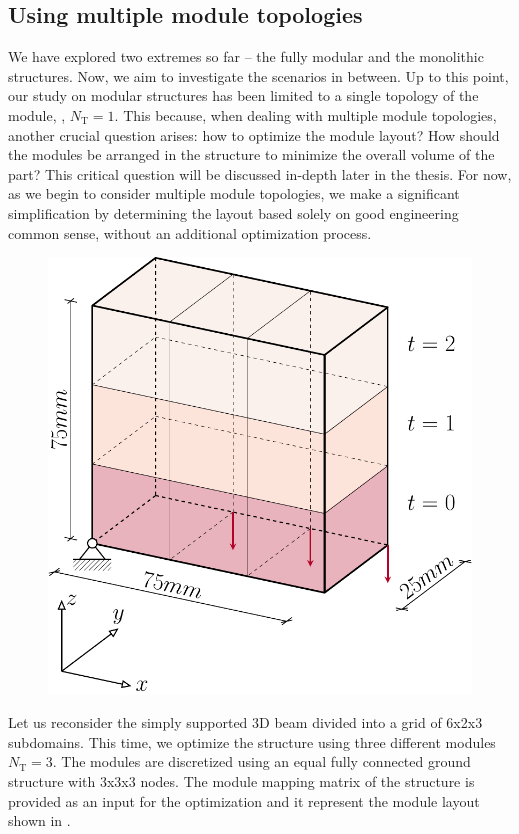 \subsection{Using multiple module topologies}
We have explored two extremes so far -- the fully modular and the monolithic structures. Now, we aim to investigate the scenarios in between. Up to this point, our study on modular structures has been limited to a single topology of the module, \ie, $N_\text{T}=1$. This because, when dealing with multiple module topologies, another crucial question arises: how to optimize the module layout? How should the modules be arranged in the structure to minimize the overall volume of the part? This critical question will be discussed in-depth later in the thesis. For now, as we begin to consider multiple module topologies, we make a significant simplification by determining the layout based solely on good engineering common sense, without an additional optimization process.

\begin{figure}
    \centering
    \includegraphics[width=0.6\linewidth]{figures/05_cellular_opt/00_mutiple_bc/supported_3D_symm.pdf}
    \caption{}
    \label{fig:05_mutiple_bc}
\end{figure}

Let us reconsider the simply supported 3D beam divided into a grid of 6x2x3 subdomains. This time, we optimize the structure using three different modules $N_\text{T}=3$. The modules are discretized using an equal fully connected ground structure with 3x3x3 nodes. The module mapping matrix of the structure is provided as an input for the optimization
and it represent the module layout shown in . 

